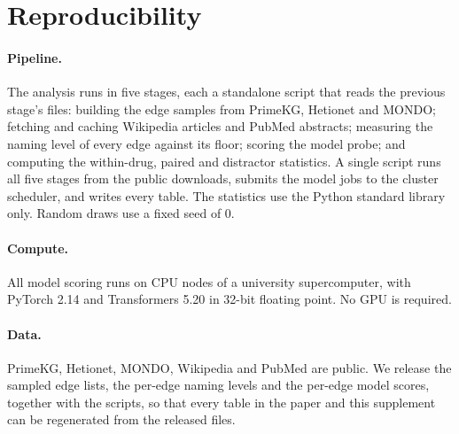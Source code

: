 \documentclass[letterpaper]{article} %
\begin{document}
\section{Reproducibility}

\paragraph{Pipeline.}
The analysis runs in five stages, each a standalone script that reads the
previous stage's files: building the edge samples from PrimeKG, Hetionet and
MONDO; fetching and caching Wikipedia articles and PubMed abstracts; measuring
the naming level of every edge against its floor; scoring the model probe; and
computing the within-drug, paired and distractor statistics. A single
script runs all five stages from the public downloads, submits the model jobs
to the cluster scheduler, and writes every table. The statistics use the
Python standard library only. Random draws use a fixed seed of 0.

\paragraph{Compute.}
All model scoring runs on CPU nodes of a university supercomputer, with
PyTorch 2.14 and Transformers 5.20 in 32-bit floating point. No GPU is
required.

\paragraph{Data.}
PrimeKG, Hetionet, MONDO, Wikipedia and PubMed are public. We release the
sampled edge lists, the per-edge naming levels and the per-edge model scores,
together with the scripts, so that every table in the paper and this
supplement can be regenerated from the released files.


\end{document}
